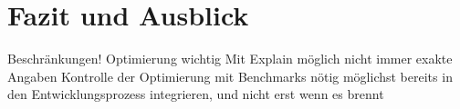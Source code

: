 \chapter{Fazit und Ausblick}

Beschränkungen!
Optimierung wichtig
Mit Explain möglich
nicht immer exakte Angaben
Kontrolle der Optimierung mit Benchmarks nötig
möglichst bereits in den Entwicklungsprozess integrieren, und nicht erst wenn es brennt
